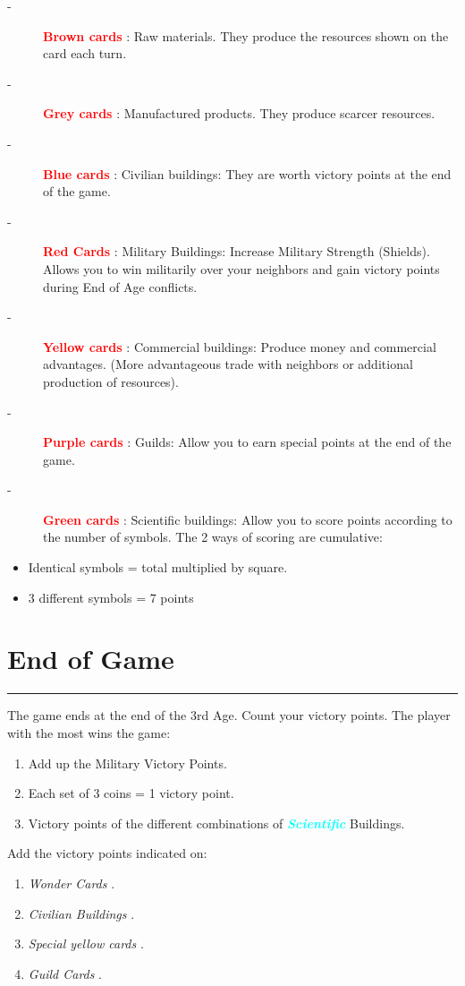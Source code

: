 \documentclass{scrartcl}%
\begin{document}
%
\begin{description}%
\item[{-} ]%
%
\textcolor{red}{%
\textbf{Brown cards}%
}%
: Raw materials. They produce the resources shown on the card each turn.
%
\item[{-} ]%
%
\textcolor{red}{%
\textbf{Grey cards}%
}%
: Manufactured products. They produce scarcer resources.
%
\item[{-} ]%
%
\textcolor{red}{%
\textbf{Blue cards}%
}%
: Civilian buildings: They are worth victory points at the end of the game.
%
\item[{-} ]%
%
\textcolor{red}{%
\textbf{Red Cards}%
}%
: Military Buildings: Increase Military Strength (Shields). Allows you to win militarily over your neighbors and gain victory points during End of Age conflicts.
%
\item[{-} ]%
%
\textcolor{red}{%
\textbf{Yellow cards}%
}%
: Commercial buildings: Produce money and commercial advantages. (More advantageous trade with neighbors or additional production of resources).
%
\item[{-} ]%
%
\textcolor{red}{%
\textbf{Purple cards}%
}%
: Guilds: Allow you to earn special points at the end of the game.
%
\item[{-} ]%
%
\textcolor{red}{%
\textbf{Green cards}%
}%
: Scientific buildings: Allow you to score points according to the number of symbols. The 2 ways of scoring are cumulative:
%
\end{description}%
\begin{itemize}%
\item%
%
 Identical symbols = total multiplied by square.
%
\item%
%
 3 different symbols = 7 points
%
\end{itemize}

%
\sectionfont{\color{cyan}}%
\subsectionfont{\color{cyan}}%
\subsubsectionfont{\color{cyan}}%
\section{ End of Game
}%
\label{sec:EndofGame}%
\textcolor{cyan}{\rule{18cm}{0.07cm}}\break%
The game ends at the end of the 3rd Age. Count your victory points. The player with the most wins the game:
%
\begin{enumerate}%
\item%
%
 Add up the Military Victory Points.
%
\item%
%
 Each set of 3 coins = 1 victory point.
%
\item%
%
 Victory points of the different combinations of %
\textcolor{cyan}{\textbf{\textit{Scientific}}}%
\textit{ }%
 Buildings.
%
\end{enumerate}%
Add the victory points indicated on:
%
\begin{enumerate}%
\item%
%
\textit{Wonder Cards}%
.
%
\item%
%
\textit{Civilian Buildings}%
.
%
\item%
%
\textit{Special yellow cards}%
.
%
\item%
%
\textit{Guild Cards}%
.%
\end{enumerate}

%
\end{document}
